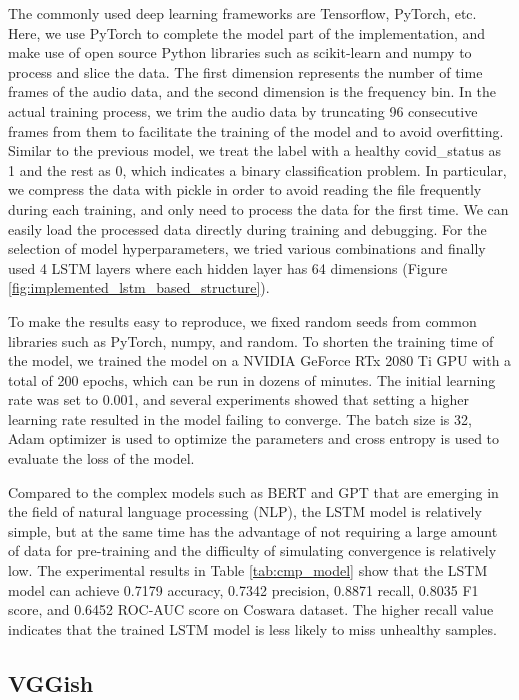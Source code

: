 \documentclass[11pt]{article}
\begin{document}
The commonly used deep learning frameworks are Tensorflow, PyTorch, etc. 
Here, we use PyTorch to complete the model part of the implementation, and 
make use of open source Python libraries such as scikit-learn and numpy to process and slice the data. 
The first dimension represents the number of time frames of the audio data, 
and the second dimension is the frequency bin. In the actual training process, 
we trim the audio data by truncating 96 consecutive frames from them to 
facilitate the training of the model and to avoid overfitting. 
Similar to the previous model, we treat the label with a healthy covid\_status as 1 and 
the rest as 0, which indicates a binary classification problem. 
In particular, we compress the data with pickle in order to avoid reading the file frequently 
during each training, and only need to process the data for the first time. 
We can easily load the processed data directly during training and debugging. 
For the selection of model hyperparameters, we tried various combinations and 
finally used 4 LSTM layers where each hidden layer has 64 dimensions (Figure \ref{fig:implemented_lstm_based_structure}).

To make the results easy to reproduce, we fixed random seeds from common libraries 
such as PyTorch, numpy, and random. To shorten the training time of the model, 
we trained the model on a NVIDIA GeForce RTx 2080 Ti GPU with a total of 200 epochs, 
which can be run in dozens of minutes. The initial learning rate was set to 0.001, 
and several experiments showed that setting a higher learning rate resulted 
in the model failing to converge. The batch size is 32, Adam optimizer is used to 
optimize the parameters and cross entropy is used to evaluate the loss of the model.

Compared to the complex models such as BERT \cite{devlin2018bert} and GPT \cite{floridi2020gpt} 
that are emerging in the field of natural language processing (NLP), the LSTM model is relatively simple, 
but at the same time has the advantage of not requiring a large amount of data for pre-training and 
the difficulty of simulating convergence is relatively low. The experimental results in 
Table \ref{tab:cmp_model} show that the LSTM model can achieve 0.7179 accuracy, 0.7342 precision, 
0.8871 recall, 0.8035 F1 score, and 0.6452 ROC-AUC score on Coswara dataset. 
The higher recall value indicates that the trained LSTM model is less likely to miss unhealthy samples.

\subsection{VGGish}
\end{document}
